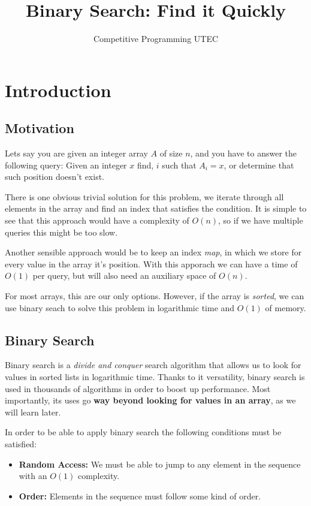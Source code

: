 \documentclass{article}
\title{Binary Search: Find it Quickly}
\author{Competitive Programming UTEC}
\begin{document}
\maketitle

\section{Introduction}

\subsection{Motivation}

Lets say you are given an integer array $A$ of size $n$, and you have to answer the following query: Given an integer $x$ find, $i$ such that $A_i = x$, or determine that such position doesn't exist. 

There is one obvious trivial solution for this problem, we iterate through all elements in the array and find an index that satisfies the condition. It is simple to see that this approach would have a complexity of $O(n)$, so if we have multiple queries this might be too slow.

Another sensible approach would be to keep an index \textit{map}, in which we store for every value in the array it's position. With this apporach we can have a time of $O(1)$ per query, but will also need an auxiliary space of $O(n)$.

For most arrays, this are our only options. However, if the array is \textit{sorted}, we can use binary seach to solve this problem in logarithmic time and $O(1)$ of memory.

\subsection{Binary Search}

Binary search is a \textit{divide and conquer} search algorithm that allows us to look for values in sorted lists in logarithmic time. Thanks to it versatility, binary search is used in thousands of algorithms in order to boost up performance. Most importantly, its uses go \textbf{way beyond looking for values in an array}, as we will learn later.

In order to be able to apply binary search the following conditions must be satisfied:

\begin{itemize}
	\item \textbf{Random Access:} We must be able to jump to any element in the sequence with an $O(1)$ complexity.
	\item \textbf{Order:} Elements in the sequence must follow some kind of order.
\end{itemize}
\end{document}
